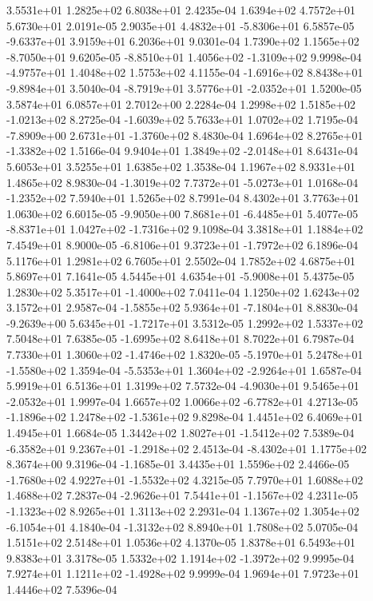 3.5531e+01 1.2825e+02 6.8038e+01  2.4235e-04
1.6394e+02 4.7572e+01 5.6730e+01  2.0191e-05
 2.9035e+01  4.4832e+01 -5.8306e+01  6.5857e-05
-9.6337e+01  3.9159e+01  6.2036e+01  9.0301e-04
 1.7390e+02  1.1565e+02 -8.7050e+01  9.6205e-05
-8.8510e+01  1.4056e+02 -1.3109e+02  9.9998e-04
-4.9757e+01  1.4048e+02  1.5753e+02  4.1155e-04
-1.6916e+02  8.8438e+01 -9.8984e+01  3.5040e-04
-8.7919e+01  3.5776e+01 -2.0352e+01  1.5200e-05
3.5874e+01 6.0857e+01 2.7012e+00  2.2284e-04
 1.2998e+02  1.5185e+02 -1.0213e+02  8.2725e-04
-1.6039e+02  5.7633e+01  1.0702e+02  1.7195e-04
-7.8909e+00  2.6731e+01 -1.3760e+02  8.4830e-04
 1.6964e+02  8.2765e+01 -1.3382e+02  1.5166e-04
 9.9404e+01  1.3849e+02 -2.0148e+01  8.6431e-04
5.6053e+01 3.5255e+01 1.6385e+02  1.3538e-04
1.1967e+02 8.9331e+01 1.4865e+02  8.9830e-04
-1.3019e+02  7.7372e+01 -5.0273e+01  1.0168e-04
-1.2352e+02  7.5940e+01  1.5265e+02  8.7991e-04
8.4302e+01 3.7763e+01 1.0630e+02  6.6015e-05
-9.9050e+00  7.8681e+01 -6.4485e+01  5.4077e-05
-8.8371e+01  1.0427e+02 -1.7316e+02  9.1098e-04
3.3818e+01 1.1884e+02 7.4549e+01  8.9000e-05
-6.8106e+01  9.3723e+01 -1.7972e+02  6.1896e-04
5.1176e+01 1.2981e+02 6.7605e+01  2.5502e-04
1.7852e+02 4.6875e+01 5.8697e+01  7.1641e-05
 4.5445e+01  4.6354e+01 -5.9008e+01  5.4375e-05
 1.2830e+02  5.3517e+01 -1.4000e+02  7.0411e-04
1.1250e+02 1.6243e+02 3.1572e+01  2.9587e-04
-1.5855e+02  5.9364e+01 -7.1804e+01  8.8830e-04
-9.2639e+00  5.6345e+01 -1.7217e+01  3.5312e-05
1.2992e+02 1.5337e+02 7.5048e+01  7.6385e-05
-1.6995e+02  8.6418e+01  8.7022e+01  6.7987e-04
 7.7330e+01  1.3060e+02 -1.4746e+02  1.8320e-05
-5.1970e+01  5.2478e+01 -1.5580e+02  1.3594e-04
-5.5353e+01  1.3604e+02 -2.9264e+01  1.6587e-04
5.9919e+01 6.5136e+01 1.3199e+02  7.5732e-04
-4.9030e+01  9.5465e+01 -2.0532e+01  1.9997e-04
 1.6657e+02  1.0066e+02 -6.7782e+01  4.2713e-05
-1.1896e+02  1.2478e+02 -1.5361e+02  9.8298e-04
1.4451e+02 6.4069e+01 1.4945e+01  1.6684e-05
 1.3442e+02  1.8027e+01 -1.5412e+02  7.5389e-04
-6.3582e+01  9.2367e+01 -1.2918e+02  2.4513e-04
-8.4302e+01  1.1775e+02  8.3674e+00  9.3196e-04
-1.1685e-01  3.4435e+01  1.5596e+02  2.4466e-05
-1.7680e+02  4.9227e+01 -1.5532e+02  4.3215e-05
7.7970e+01 1.6088e+02 1.4688e+02  7.2837e-04
-2.9626e+01  7.5441e+01 -1.1567e+02  4.2311e-05
-1.1323e+02  8.9265e+01  1.3113e+02  2.2931e-04
 1.1367e+02  1.3054e+02 -6.1054e+01  4.1840e-04
-1.3132e+02  8.8940e+01  1.7808e+02  5.0705e-04
1.5151e+02 2.5148e+01 1.0536e+02  4.1370e-05
1.8378e+01 6.5493e+01 9.8383e+01  3.3178e-05
 1.5332e+02  1.1914e+02 -1.3972e+02  9.9995e-04
 7.9274e+01  1.1211e+02 -1.4928e+02  9.9999e-04
1.9694e+01 7.9723e+01 1.4446e+02  7.5396e-04
